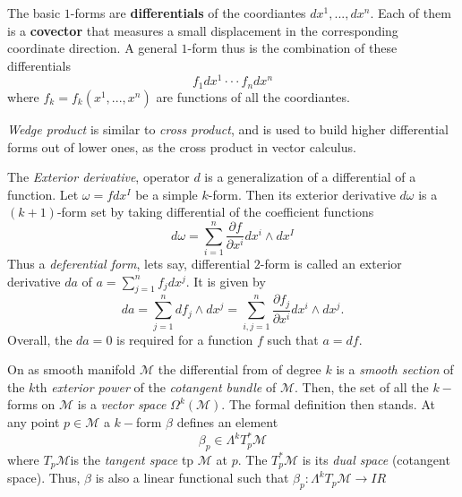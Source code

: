 {    The basic $1$-forms are \textbf{differentials} of the coordiantes $dx^1,...,dx^n$. 
    Each of them is a \textbf{covector} that measures a small displacement in the corresponding coordinate direction. A general $1$-form thus is the combination of these differentials 
    \begin{equation}
        f_1dx^1\cdot\cdot\cdot f_ndx^n
    \end{equation}
    where $f_k=f_k(x^1,...,x^n)$ are functions of all the coordiantes. 
    
    \textit{Wedge product} is similar to \textit{cross product}, and is used to build higher differential forms out of lower ones, as the cross product in vector calculus.
    
    The \textit{Exterior derivative}, operator $d$ is a generalization of a differential of a function. 
    Let $\omega=fdx^I$ be a simple $k$-form. Then its exterior derivative $d\omega$ is a $(k+1)$-form set by taking differential of the coefficient functions
    \begin{equation}
        d\omega = \sum_{i=1}^n \frac{\partial f}{\partial x^i}dx^i \wedge dx^I
    \end{equation}
    Thus a \textit{deferential form}, lets say, differential $2$-form is called an exterior derivative $da$ of $a=\sum_{j=1}^{n}f_j dx^j$. 
    It is given by
    \begin{equation}
        da = \sum_{j=1}^n df_j \wedge dx^j = \sum_{i,j=1}^n \frac{\partial f_j}{\partial x^i}dx^i\wedge dx^j.
    \end{equation}
    Overall, the $da=0$ is required for a function $f$ such that $a=df$.
    
    On as smooth manifold $\mathcal{M}$ the differential from of degree $k$ is a \textit{smooth section} of the $k$th \textit{exterior power} of the \textit{cotangent bundle} of $\mathcal{M}$. 
    Then, the set of all the $k-$forms on $\mathcal{M}$ is a \textit{vector space} $\Omega^k(\mathcal{M})$. 
    The formal definition then stands. At any point $p\in \mathcal{M}$ a $k-$form $\beta$ defines an element 
    \begin{equation}
        \beta_p\in\Lambda^kT^* _p \mathcal{M}
    \end{equation}
    where $T_p\mathcal{M}$is the \textit{tangent space} tp $\mathcal{M}$ at $p$. The $T^* _p \mathcal{M}$ is its \textit{dual space} (cotangent space). Thus, $\beta$ is also a linear functional such that $\beta_p:\Lambda^k T_p \mathcal{M}\rightarrow I\!R$
    
}
